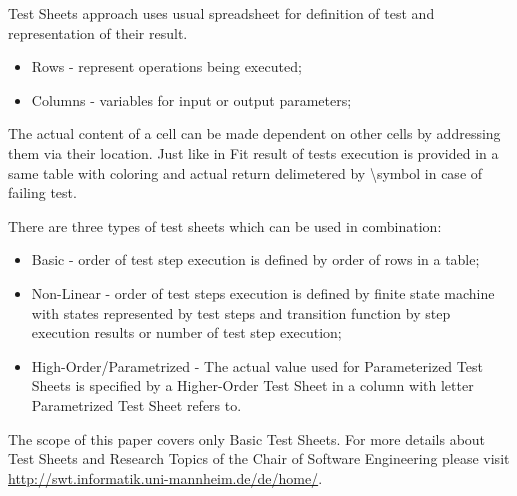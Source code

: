 Test Sheets approach uses usual spreadsheet for definition of test and representation of their result. 
\begin{itemize}
	\item Rows - represent operations being executed;
	\item Columns -  variables for input or output parameters;
\end{itemize}

The actual content of a cell can be made dependent on other cells by addressing them via their location.
Just like in Fit result of tests execution is provided in a same table with coloring and actual return delimetered by \textbackslash symbol in case of failing test. \cite{tsb}

There are three types of test sheets which can be used in combination:
\begin{itemize}
	\item Basic - order of test step execution is defined by order of rows in a table;
	\item Non-Linear - order of test steps execution is defined by finite state machine with states represented by test steps and transition function by step execution results or number of test step execution;
	\item High-Order/Parametrized - The actual value used for Parameterized Test Sheets is specified by a Higher-Order Test Sheet in a column with letter Parametrized Test Sheet refers to.
\end{itemize}

The scope of this paper covers only Basic Test Sheets. For more details about Test Sheets and Research Topics of the Chair of Software Engineering please visit \url{http://swt.informatik.uni-mannheim.de/de/home/}.

